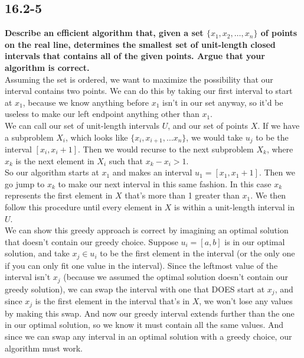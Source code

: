\documentclass[11pt]{article}
\begin{document}
 \subsection*{16.2-5}
 \textbf{Describe an efficient algorithm that, given a set $\{x_1,x_2,\dots,x_n\}$ of points 
 on the real line, determines the smallest set of unit-length closed intervals that contains 
 all of the given points. Argue that your algorithm is correct.} \\

 Assuming the set is ordered, we want to maximize the possibility that our interval contains 
 two points.  We can do this by taking our first interval to start at $x_1$, because we know 
 anything before $x_1$ isn't in our set anyway, so it'd be useless to make our left endpoint 
 anything other than $x_1$.  \\ 

 We can call our set of unit-length intervals $U$, and our set of points $X$.  If we have a 
 subproblem $X_i$, which looks like $\{x_i, x_{i+1}, \dots x_n\}$, we would take $u_j$ to be 
 the interval $[x_i,x_i+1]$. Then we would recurse to the next subproblem $X_k$, where $x_k$ is
 the next element in $X_i$ such that $x_k - x_i > 1$. \\

 So our algorithm starts at $x_1$ and makes an interval $u_1 = [x_1,x_1+1]$.  Then we go jump 
 to $x_k$ to make our next interval in this same fashion.  In this case $x_k$ represents the 
 first element in $X$ that's more than 1 greater than $x_1$.  We then follow this procedure 
 until every element in $X$ is within a unit-length interval in $U$. \\

 We can show this greedy approach is correct by imagining an optimal solution that doesn't 
 contain our greedy choice.  Suppose $u_i = [a,b]$ is in our optimal solution, and take 
 $x_j \in u_i$ to be the first element in the interval (or the only one if you can only fit one 
 value in the interval).  Since the leftmost value of the interval isn't $x_j$ (because we 
 assumed the optimal solution doesn't contain our greedy solution), we can swap the interval 
 with one that DOES start at $x_j$, and since $x_j$ is the first element in the interval that's 
 in $X$, we won't lose any values by making this swap.  And now our greedy interval extends 
 further than the one in our optimal solution, so we know it must contain all the same values.  
 And since we can swap any interval in an optimal solution with a greedy choice, our algorithm 
 must work.
 \newpage
\end{document}
